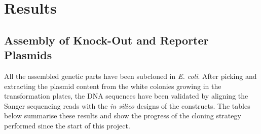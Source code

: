 \section{Results}
\subsection{Assembly of Knock-Out and Reporter Plasmids}

All the assembled genetic parts have been subcloned in \textit{E. coli}. After picking and extracting the plasmid content from the white colonies growing in the transformation plates, the DNA sequences have been validated by aligning the Sanger sequencing reads with the \textit{in silico} designs of the constructs. The tables below summarise these results and show the progress of the cloning strategy performed since the start of this project. 

